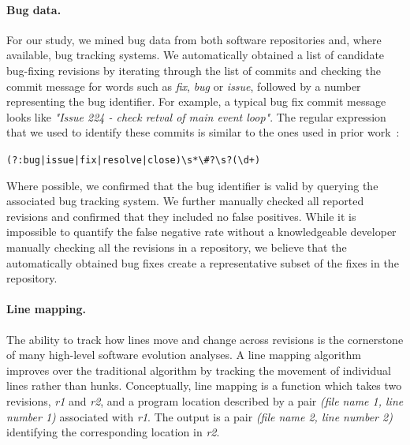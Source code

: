 
\paragraph{Bug data.} For our study, we mined bug data from both software
repositories and, where available, bug tracking systems.  We automatically
obtained a list of candidate bug-fixing revisions by iterating through the list
of commits and checking the commit message for words such as {\em fix}, {\em
bug} or {\em issue}, followed by a number representing the bug identifier.  For
example, a typical \memcached bug fix commit message looks like {\em "Issue 224
- check retval of main event loop"}. The regular expression that we used to
identify these commits is similar to the ones used in prior
work~\cite{genealogies:issre13}:

\lstinline`(?:bug|issue|fix|resolve|close)\s*\#?\s?(\d+)`

Where possible, we confirmed that the bug identifier is valid by querying the
associated bug tracking system. We further manually checked all reported
revisions and confirmed that they included no false positives.  While it is
impossible to quantify the false negative rate without a knowledgeable
developer manually checking all the revisions in a repository, we believe that
the automatically obtained bug fixes create a representative subset of the
fixes in the repository.

\paragraph{Line mapping.} The ability to track how lines move and change
across revisions is the cornerstone of many high-level software
evolution analyses.  A line mapping algorithm improves over the
traditional \diff algorithm by tracking the movement of individual
lines rather than hunks.  Conceptually, line mapping is a function
which takes two revisions, \textit{r1} and \textit{r2}, and a program
location described by a pair \textit{(file name 1, line number 1)}
associated with \textit{r1}.  The output is a pair \textit{(file name
  2, line number 2)} identifying the corresponding location in
\textit{r2}.

